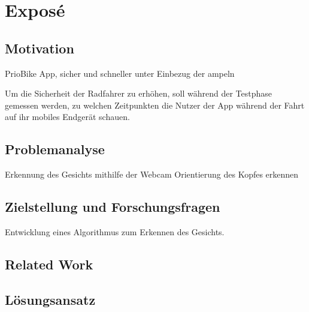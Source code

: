 \chapter{Exposé}\label{ch:Expose}

\section{Motivation}\label{sec:Expose:Motivation}


PrioBike App, sicher und schneller unter Einbezug der ampeln

Um die Sicherheit der Radfahrer zu erhöhen, soll während der Testphase gemessen werden, zu welchen Zeitpunkten die Nutzer der App während der Fahrt auf ihr mobiles Endgerät schauen. 

\section{Problemanalyse}\label{sec:Expose:Problemanalyse}


Erkennung des Gesichts mithilfe der Webcam
Orientierung des Kopfes erkennen

\section{Zielstellung und Forschungsfragen}\label{sec:Expose:Zielstellung}

Entwicklung eines Algorithmus zum Erkennen des Gesichts.



\section{Related Work}\label{sec:Expose:Related}

\section{Lösungsansatz}\label{sec:Expose:Lösungsansatz}

